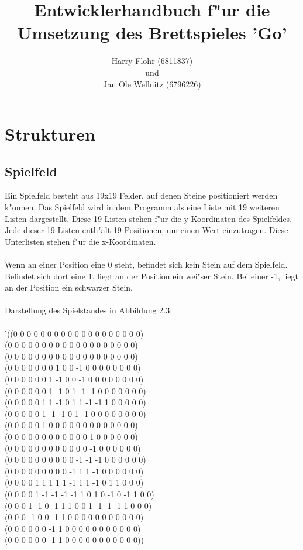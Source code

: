 \documentclass[a4paper]{scrreprt}
\begin{document}
 
\title{Entwicklerhandbuch f"ur die Umsetzung des Brettspieles 'Go'}
\author{Harry Flohr (6811837)\\und\\Jan Ole Wellnitz (6796226)}
\maketitle
 \tableofcontents 
 
 \chapter{Strukturen}
\section{Spielfeld}
\label{sec:Spielfeld}
Ein Spielfeld besteht aus 19x19 Felder, auf denen Steine positioniert werden k"onnen. Das Spielfeld wird in dem Programm als eine Liste mit 19 weiteren Listen dargestellt. Diese 19 Listen stehen f"ur die y-Koordinaten des Spielfeldes. Jede dieser 19 Listen enth"alt 19 Positionen, um einen Wert einzutragen. Diese Unterlisten stehen f"ur die x-Koordinaten.\\\\
Wenn an einer Position eine 0 steht, befindet sich kein Stein auf dem Spielfeld. Befindet sich dort eine 1, liegt an der Position ein wei"ser Stein. Bei einer -1, liegt an der Position ein schwarzer Stein.\\
\\Darstellung des Spielstandes in Abbildung 2.3:\\\\
'((0 0 0 0 0 0 0 0 0 0 0 0 0 0 0 0 0 0 0)\\
  (0 0 0 0 0 0 0 0 0 0 0 0 0 0 0 0 0 0 0)\\
  (0 0 0 0 0 0 0 0 0 0 0 0 0 0 0 0 0 0 0)\\
  (0 0 0 0 0 0 0 1 0 0 -1 0 0 0 0 0 0 0 0)\\
  (0 0 0 0 0 0 1 -1 0 0 -1 0 0 0 0 0 0 0 0)\\
  (0 0 0 0 0 0 1 -1 0 1 -1 -1 0 0 0 0 0 0 0)\\
  (0 0 0 0 0 1 1 -1 0 1 1 -1 -1 1 0 0 0 0 0)\\
  (0 0 0 0 0 1 -1 -1 0 1 -1 0 0 0 0 0 0 0 0)\\
  (0 0 0 0 0 1 0 0 0 0 0 0 0 0 0 0 0 0 0)\\
  (0 0 0 0 0 0 0 0 0 0 0 0 1 0 0 0 0 0 0)\\
  (0 0 0 0 0 0 0 0 0 0 0 0 -1 0 0 0 0 0 0)\\
  (0 0 0 0 0 0 0 0 0 0 -1 -1 -1 0 0 0 0 0 0)\\
  (0 0 0 0 0 0 0 0 0 -1 1 1 -1 0 0 0 0 0 0)\\
  (0 0 0 0 1 1 1 1 1 -1 1 1 -1 0 1 1 0 0 0)\\
  (0 0 0 0 1 -1 -1 -1 -1 1 0 1 0 -1 0 -1 1 0 0)\\
  (0 0 0 1 -1 0 -1 1 1 0 0 1 -1 -1 -1 1 0 0 0)\\
  (0 0 0 -1 0 0 -1 1 0 0 0 0 0 0 0 0 0 0 0)\\
  (0 0 0 0 0 0 -1 1 0 0 0 0 0 0 0 0 0 0 0)\\
  (0 0 0 0 0 0 -1 1 0 0 0 0 0 0 0 0 0 0 0))\\
\end{document}
